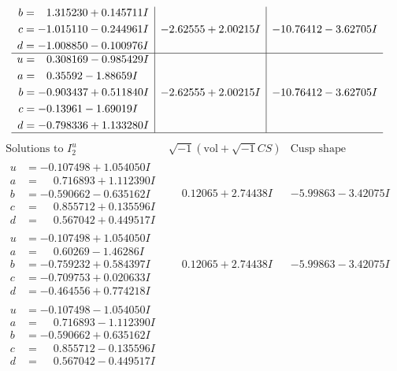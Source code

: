\documentclass[1p]{elsarticle_modified}
\theoremstyle{definition}
\newcommand{\I}{\sqrt{-1}}
\begin{document}
$$\begin{array}{c|c|c}
\begin{aligned}
b &= \phantom{-}1.315230 + 0.145711 I \\
c &= -1.015110 - 0.244961 I \\
d &= -1.008850 - 0.100976 I\end{aligned}
 & -2.62555 + 2.00215 I & -10.76412 - 3.62705 I \\ \hline\begin{aligned}
u &= \phantom{-}0.308169 - 0.985429 I \\
a &= \phantom{-}0.35592 - 1.88659 I \\
b &= -0.903437 + 0.511840 I \\
c &= -0.13961 - 1.69019 I \\
d &= -0.798336 + 1.133280 I\end{aligned}
 & -2.62555 + 2.00215 I & -10.76412 - 3.62705 I\\
 \hline 
 \end{array}$$\newpage$$\begin{array}{c|c|c}  
\text{Solutions to }I^u_{2}& \I (\text{vol} + \sqrt{-1}CS) & \text{Cusp shape}\\
 \hline 
\begin{aligned}
u &= -0.107498 + 1.054050 I \\
a &= \phantom{-}0.716893 + 1.112390 I \\
b &= -0.590662 - 0.635162 I \\
c &= \phantom{-}0.855712 + 0.135596 I \\
d &= \phantom{-}0.567042 + 0.449517 I\end{aligned}
 & \phantom{-}0.12065 + 2.74438 I & -5.99863 - 3.42075 I \\ \hline\begin{aligned}
u &= -0.107498 + 1.054050 I \\
a &= \phantom{-}0.60269 - 1.46286 I \\
b &= -0.759232 + 0.584397 I \\
c &= -0.709753 + 0.020633 I \\
d &= -0.464556 + 0.774218 I\end{aligned}
 & \phantom{-}0.12065 + 2.74438 I & -5.99863 - 3.42075 I \\ \hline\begin{aligned}
u &= -0.107498 - 1.054050 I \\
a &= \phantom{-}0.716893 - 1.112390 I \\
b &= -0.590662 + 0.635162 I \\
c &= \phantom{-}0.855712 - 0.135596 I \\
d &= \phantom{-}0.567042 - 0.449517 I\end{aligned}

\end{array}$$
\end{document}
